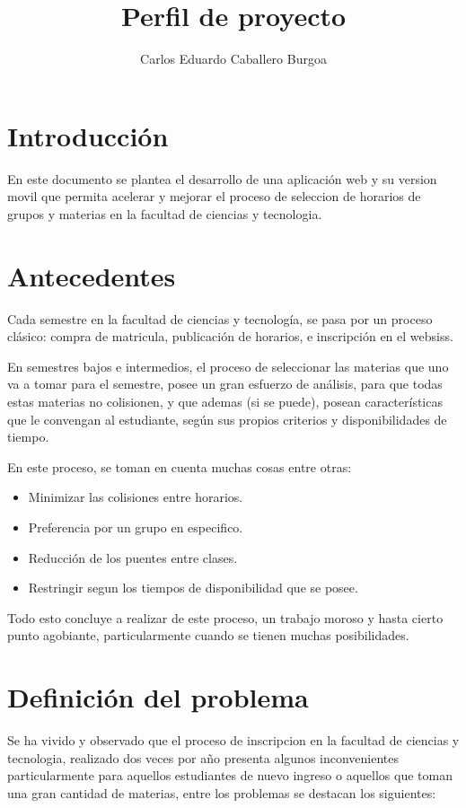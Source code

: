 \documentclass[letterpaper,11pt]{article}
\title{Perfil de proyecto}
\author{Carlos Eduardo Caballero Burgoa}
\begin{document}
\maketitle
\section{Introducción}
En este documento se plantea el desarrollo de una aplicación web y su version
movil que permita acelerar y mejorar el proceso de seleccion de horarios de
grupos y materias en la facultad de ciencias y tecnologia.

\section{Antecedentes}
Cada semestre en la facultad de ciencias y tecnología, se pasa por un proceso
clásico: compra de matricula, publicación de horarios, e inscripción en el
websiss.

En semestres bajos e intermedios, el proceso de seleccionar las materias que uno
va a tomar para el semestre, posee un gran esfuerzo de análisis, para que todas
estas materias no colisionen, y que ademas (si se puede), posean características
que le convengan al estudiante, según sus propios criterios y disponibilidades
de tiempo.

En este proceso, se toman en cuenta muchas cosas entre otras:

\begin{itemize}
\item Minimizar las colisiones entre horarios.
\item Preferencia por un grupo en especifico.
\item Reducción de los puentes entre clases.
\item Restringir segun los tiempos de disponibilidad que se posee.
\end{itemize}

Todo esto concluye a realizar de este proceso, un trabajo moroso y hasta
cierto punto agobiante, particularmente cuando se tienen muchas posibilidades.

\section{Definición del problema}
Se ha vivido y observado que el proceso de inscripcion en la facultad de
ciencias y tecnologia, realizado dos veces por año presenta algunos
inconvenientes particularmente para aquellos estudiantes de nuevo ingreso o
aquellos que toman una gran cantidad de materias, entre los problemas se
destacan los siguientes:
\end{document}
